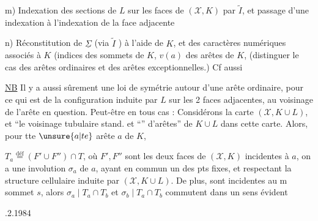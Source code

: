 m) Indexation des sections de $L$ sur les faces de $(\mathcal X,K)$  par $\widetilde I$, et passage d'une indexation à l'indexation de la face adjacente

n) Réconstitution de  $\underline{\Sigma}$ (via $\widetilde I$ \unsure{---}) à l'aide de $K$, et des caractères numériques associés à $K$ (indices des  sommets de $K$,  $v(a)$ des arêtes  de $K$,  (distinguer le cas des arêtes ordinaires et des arêtes exceptionnelles.) Cf aussi

\uline{NB} Il y a aussi sûrement une loi de symétrie autour d'une arête ordinaire, pour ce qui est de la configuration induite par $L$ sur les 2 faces adjacentes, au voisinage de l'arête en question. Peut-être  en tous cas : Considérons la carte $(\mathcal X,K\cup L)$, et ``le voisinage tubulaire stand. et ``'' d'arêtes'' de   $K\cup L$ dans cette carte.  Alors, pour tte $\unsure{a|te}$ arête $a$ de $K$, 


$T_a\overset{\mathrm{déf}}{=}(F'\cup F'')\cap T$, où $F',F''$ sont les deux faces de $(\mathcal X,K)$ incidentes à $a$, on a une involution \deleted{\unsure{$\varphi$}} $\sigma_a$ de $a$, ayant en commun un des pts fixes, et respectant la structure cellulaire induite par $(\mathcal X,K\cup L)$. De plus,  sont incidentes au m sommet $s$, alors $\sigma_a\mid T_a\cap T_b$ et $\sigma_b\mid T_a\cap T_b$ commutent dans un sens évident


.2.1984

